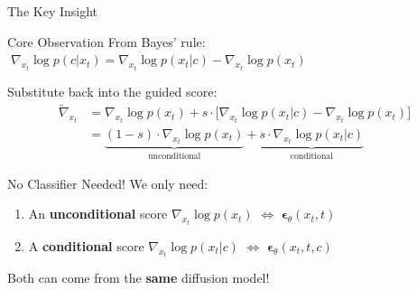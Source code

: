 \documentclass[aspectratio=169, 11pt]{beamer}
\begin{document}
\begin{frame}{The Key Insight}

\begin{block}{Core Observation}
From Bayes' rule: $\;\nabla_{x_t} \log p(c|x_t) = \nabla_{x_t} \log p(x_t|c) - \nabla_{x_t} \log p(x_t)$
\end{block}

\bigskip
Substitute back into the guided score:
\begin{align}
    \tilde{\nabla}_{x_t}
    &= \nabla_{x_t}\log p(x_t) + s\cdot\Big[\nabla_{x_t}\log p(x_t|c) - \nabla_{x_t}\log p(x_t)\Big] \nonumber \\[6pt]
    &= \underbrace{(1-s)\cdot\nabla_{x_t}\log p(x_t)}_{\text{unconditional}} + \underbrace{s\cdot\nabla_{x_t}\log p(x_t|c)}_{\text{conditional}} \nonumber
\end{align}

\bigskip
\begin{alertblock}{No Classifier Needed!}
We only need:
\begin{enumerate}
    \item An \textbf{unconditional} score $\nabla_{x_t}\log p(x_t)$ \quad $\Leftrightarrow$ \quad $\boldsymbol{\epsilon}_\theta(x_t, t)$
    \item A \textbf{conditional} score $\nabla_{x_t}\log p(x_t|c)$ \quad $\Leftrightarrow$ \quad $\boldsymbol{\epsilon}_\theta(x_t, t, c)$
\end{enumerate}
Both can come from the \textbf{same} diffusion model!
\end{alertblock}

\end{frame}
\end{document}
